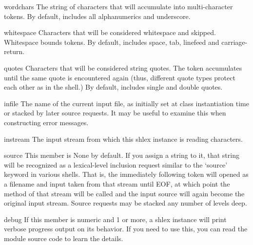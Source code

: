 \begin{memberdesc}{wordchars}
The string of characters that will accumulate into multi-character
tokens. By default, includes all \ASCII{} alphanumerics and
underscore.
\end{memberdesc}

\begin{memberdesc}{whitespace}
Characters that will be considered whitespace and skipped.  Whitespace
bounds tokens.  By default, includes space, tab, linefeed and
carriage-return.
\end{memberdesc}

\begin{memberdesc}{quotes}
Characters that will be considered string quotes.  The token
accumulates until the same quote is encountered again (thus, different
quote types protect each other as in the shell.)  By default, includes
\ASCII{} single and double quotes.
\end{memberdesc}

\begin{memberdesc}{infile}
The name of the current input file, as initially set at class
instantiation time or stacked by later source requests.  It may
be useful to examine this when constructing error messages.
\end{memberdesc}

\begin{memberdesc}{instream}
The input stream from which this shlex instance is reading characters.
\end{memberdesc}

\begin{memberdesc}{source}
This member is None by default.  If you assign a string to it, that
string will be recognized as a lexical-level inclusion request similar
to the `source' keyword in various shells.  That is, the immediately
following token will opened as a filename and input taken from that
stream until EOF, at which point the  method of that
stream will be called and the input source will again become the
original input stream. Source requests may be stacked any number of
levels deep.
\end{memberdesc}

\begin{memberdesc}{debug}
If this member is numeric and 1 or more, a shlex instance will print
verbose progress output on its behavior.  If you need to use this,
you can read the module source code to learn the details.
\end{memberdesc}

